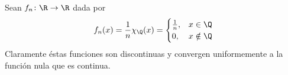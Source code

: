 \documentclass[topologia-analisis.tex]{subfiles}
\begin{document}

\begin{ex}
	Sean $f_n \colon \R \to \R$ dada por
	$$ f_n(x) = \frac{1}{n}\chi_{\Q}(x) =
	\begin{cases}
		\frac{1}{n}, & x\in\Q \\
		0, & x\notin\Q \\
	\end{cases} $$
	Claramente éstas funciones son discontinuas y convergen uniformemente a la función nula que es continua.
\end{ex}
\end{document}
